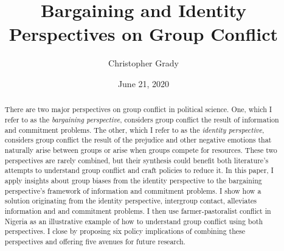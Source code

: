 \documentclass[11pt]{article}
\title{Bargaining and Identity Perspectives on Group Conflict}
\author{
Christopher Grady
}
\date{June 21, 2020}
\begin{document}
\VerbatimFootnotes

%
%
%
%
%
%
%
%
%
%

\maketitle

\begin{abstract}

There are two major perspectives on group conflict in political science.  One, which I refer to as the \textit{bargaining perspective}, considers group conflict the result of information and commitment problems.  The other, which I refer to as the \textit{identity perspective}, considers group conflict the result of the prejudice and other negative emotions that naturally arise between groups or arise when groups compete for resources.  These two perspectives are rarely combined, but their synthesis could benefit both literature's attempts to understand group conflict and craft policies to reduce it.  In this paper, I apply insights about group biases from the identity perspective to the bargaining perspective's framework of information and commitment problems.  I show how a solution originating from the identity perspective, intergroup contact, alleviates information and and commitment problems.  I then use farmer-pastoralist conflict in Nigeria as an illustrative example of how to understand group conflict using both perspectives.  I close by proposing six policy implications of combining these perspectives and offering five avenues for future research.

\end{abstract}
\end{document}
